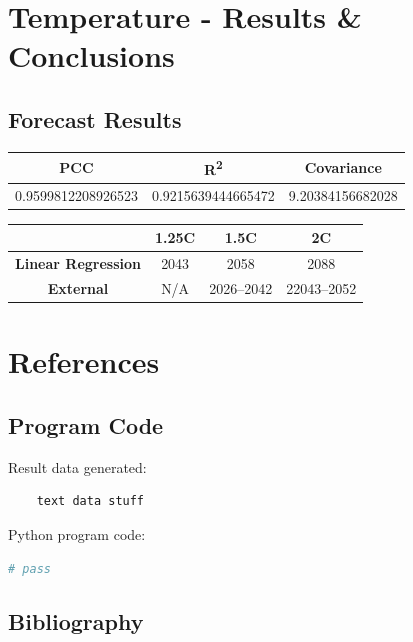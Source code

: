 \documentclass[12pt]{mcmthesis}
\begin{document}
    \section{Temperature - Results \& Conclusions}

    \subsection{Forecast Results}

    \begin{center}
        \begin{tabular}{ |c|c|c|}
            \hline
            \textbf{PCC} & \textbf{R\textsuperscript{2}} & \textbf{Covariance}\\
            \hline
            0.9599812208926523 & 0.9215639444665472 & 9.20384156682028\\
            \hline
        \end{tabular}
    \end{center}

    \begin{center}
        \begin{tabular}{ |c|c|c|c|}
            \hline
            & \textbf{1.25C} &  \textbf{1.5C} & \textbf{2C} \\
            \hline
            \textbf{Linear Regression} & 2043 & 2058 & 2088 \\
            \hline
            \textbf{External} & N/A & 2026--2042 & 22043--2052 \\ \hline
        \end{tabular}
    \end{center}



    \section{References}

    \subsection{Program Code}
    \noindent Result data generated:
    \begin{verbatim}
    text data stuff

    \end{verbatim}

    \noindent Python program code:
    \begin{lstlisting}[language=Python]
        # pass

    \end{lstlisting}


    \subsection{Bibliography}
\end{document}
